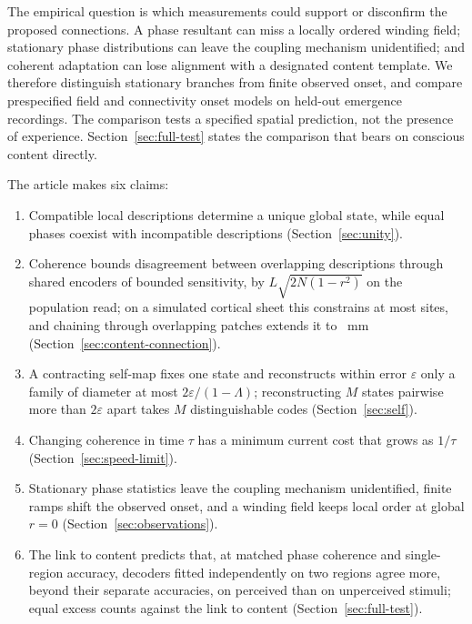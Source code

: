 \documentclass[12pt]{article}
\newcommand{\claim}[2]{\item #2 (Section~\ref{#1}).}
\begin{document}
The empirical question is which measurements could support or disconfirm the
proposed connections. A phase resultant can miss a locally ordered winding field;
stationary phase distributions can leave the coupling mechanism unidentified;
and coherent adaptation can lose alignment with a designated content
template. We therefore distinguish stationary branches from
finite observed onset, and compare prespecified field and connectivity onset
models on held-out emergence recordings. The comparison tests a specified
spatial prediction, not the presence of experience. Section~\ref{sec:full-test}
states the comparison that bears on conscious content directly.

The article makes six claims:
\begin{enumerate}
\claim{sec:unity}{Compatible local descriptions determine a unique global state, while equal phases coexist with incompatible descriptions}
\claim{sec:content-connection}{Coherence bounds disagreement between overlapping descriptions through shared encoders of bounded sensitivity, by $L\sqrt{2N(1-r^2)}$ on the population read; on a simulated cortical sheet this constrains at most \wavePatchInformativeSites{} sites, and chaining through overlapping patches extends it to \waveNerveReachMm~mm}
\claim{sec:self}{A contracting self-map fixes one state and reconstructs within error $\varepsilon$ only a family of diameter at most $2\varepsilon/(1-\Lambda)$; reconstructing $M$ states pairwise more than $2\varepsilon$ apart takes $M$ distinguishable codes}
\claim{sec:speed-limit}{Changing coherence in time $\tau$ has a minimum current cost that grows as $1/\tau$}
\claim{sec:observations}{Stationary phase statistics leave the coupling mechanism unidentified, finite ramps shift the observed onset, and a winding field keeps local order at global $r=0$}
\claim{sec:full-test}{The link to content predicts that, at matched phase coherence and single-region accuracy, decoders fitted independently on two regions agree more, beyond their separate accuracies, on perceived than on unperceived stimuli; equal excess counts against the link to content}
\end{enumerate}
\end{document}
